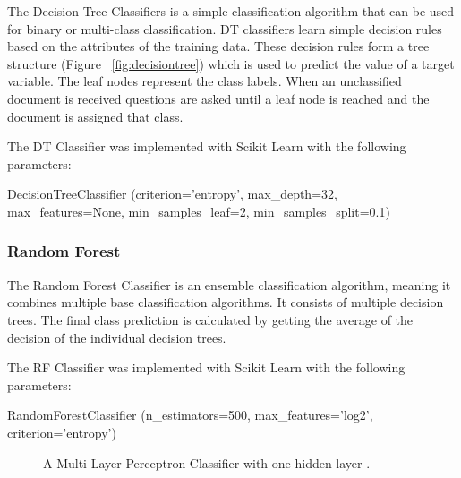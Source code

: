 The Decision Tree Classifiers is a simple classification algorithm that can be used for binary or multi-class classification. DT classifiers learn simple decision rules based on the attributes of the training data. These decision rules form a tree structure (Figure ~\ref{fig:decisiontree}) which is used to predict the value of a target variable. The leaf nodes represent the class labels. When an unclassified document is received questions are asked until a leaf node is reached and the document is assigned that class.

The DT Classifier was implemented with Scikit Learn with the following parameters:

\begin{tcolorbox}
\begin{center}
	DecisionTreeClassifier (criterion='entropy', max\_depth=32, max\_features=None, min\_samples\_leaf=2, min\_samples\_split=0.1)
\end{center}
\end{tcolorbox}

\subsubsection*{Random Forest}

The Random Forest Classifier is an ensemble classification algorithm, meaning it combines multiple base classification algorithms. It consists of multiple decision trees. The final class prediction is calculated by getting the average of the decision of the individual decision trees.

The RF Classifier was implemented with Scikit Learn with the following parameters:

\begin{tcolorbox}
\begin{center}
	RandomForestClassifier (n\_estimators=500, max\_features='log2', criterion='entropy')
\end{center}
\end{tcolorbox}

\begin{figure}[h!]
\centering
{}
\caption{\label{fig:mlp} A Multi Layer Perceptron Classifier with one hidden layer \cite{scikit-learn}.}
\end{figure}

